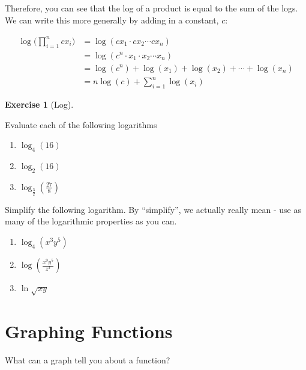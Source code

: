 \documentclass[
  letterpaper,
]{book}
\providecommand{\tightlist}{%
  \setlength{\itemsep}{0pt}\setlength{\parskip}{0pt}}\usepackage{longtable,booktabs,array}
\theoremstyle{definition}
\theoremstyle{definition}
\theoremstyle{plain}
\theoremstyle{definition}
\newtheorem{exercise}{Exercise}[chapter]
\theoremstyle{plain}
\theoremstyle{plain}
\theoremstyle{remark}
\begin{document}
Therefore, you can see that the log of a product is equal to the sum of
the logs. We can write this more generally by adding in a constant,
\(c\):

\[      
\begin{aligned}
            \log \bigg(\prod\limits_{i=1}^n c x_i\bigg) 
            &= \log(cx_1 \cdot cx_2 \cdots cx_n) \\
            &= \log(c^n \cdot x_1 \cdot x_2 \cdots x_n) \\
            &= \log(c^n) + \log(x_1) + \log(x_2) + \cdots + \log(x_n) \\
            &= n \log(c) +  \sum\limits_{i=1}^n \log (x_i)
\end{aligned}   
\]

\leavevmode{}%
\begin{exercise}[Log]\label{exr-log}

Evaluate each of the following logarithms

\begin{enumerate}
\def\labelenumi{\arabic{enumi}.}
\tightlist
\item
  \(\log_4(16)\)
\item
  \(\log_2(16)\)
\item
  \(\log_\frac{3}{2}(\frac{27}{8})\)
\end{enumerate}

Simplify the following logarithm. By ``simplify'', we actually really
mean - use as many of the logarithmic properties as you can.

\begin{enumerate}
\def\labelenumi{\arabic{enumi}.}
\setcounter{enumi}{3}
\tightlist
\item
  \(\log_4(x^3y^5)\)
\item
  \(\log(\frac{x^9y^5}{z^3})\)
\item
  \(\ln{\sqrt{xy}}\)
\end{enumerate}

\end{exercise}

\hypertarget{graphing-functions}{%
\section*{Graphing Functions}\label{graphing-functions}}

What can a graph tell you about a function?
\end{document}
